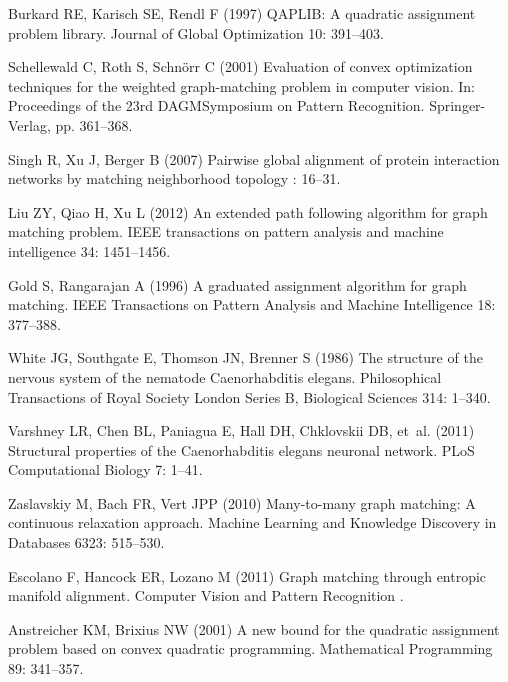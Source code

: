 \documentclass[10pt]{article}
\begin{document}
\begin{thebibliography}{10}
Burkard RE, Karisch SE, Rendl F (1997) {QAPLIB: A quadratic assignment problem
  library}.
\newblock Journal of Global Optimization 10: 391--403.

Schellewald C, Roth S, Schn\"{o}rr C (2001) {Evaluation of convex optimization
  techniques for the weighted graph-matching problem in computer vision}.
\newblock In: Proceedings of the 23rd DAGMSymposium on Pattern Recognition.
  Springer-Verlag, pp. 361--368.

Singh R, Xu J, Berger B (2007) Pairwise global alignment of protein interaction
  networks by matching neighborhood topology : 16--31.

Liu ZY, Qiao H, Xu L (2012) An extended path following algorithm for graph
  matching problem.
\newblock IEEE transactions on pattern analysis and machine intelligence 34:
  1451--1456.

Gold S, Rangarajan A (1996) {A graduated assignment algorithm for graph
  matching}.
\newblock IEEE Transactions on Pattern Analysis and Machine Intelligence 18:
  377--388.

White JG, Southgate E, Thomson JN, Brenner S (1986) {The structure of the
  nervous system of the nematode Caenorhabditis elegans.}
\newblock Philosophical Transactions of Royal Society London Series B,
  Biological Sciences 314: 1--340.

Varshney LR, Chen BL, Paniagua E, Hall DH, Chklovskii DB, et~al. (2011)
  {Structural properties of the Caenorhabditis elegans neuronal network}.
\newblock PLoS Computational Biology 7: 1--41.

Zaslavskiy M, Bach FR, Vert JPP (2010) Many-to-many graph matching: {A}
  continuous relaxation approach.
\newblock Machine Learning and Knowledge Discovery in Databases 6323: 515--530.

Escolano F, Hancock ER, Lozano M (2011) Graph matching through entropic
  manifold alignment.
\newblock Computer Vision and Pattern Recognition .

Anstreicher KM, Brixius NW (2001) {A new bound for the quadratic assignment
  problem based on convex quadratic programming}.
\newblock Mathematical Programming 89: 341--357.


\end{thebibliography}
\end{document}
